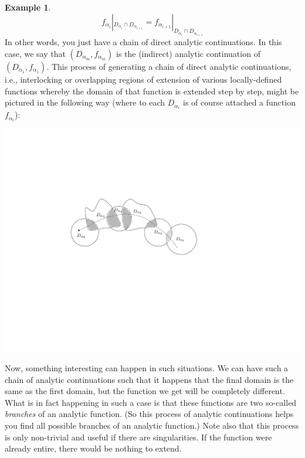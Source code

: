 \documentclass[11pt]{book}
\theoremstyle{definition}
\newtheorem{example}{Example}[section]
\theoremstyle{definition}
\theoremstyle{definition}
\theoremstyle{theorem}
\theoremstyle{definition}
\begin{document}
\begin{example}
	\begin{equation*}
	f_{\alpha_i}|_{D_{\alpha_i} \cap D_{\alpha_{i+1}}} = f_{\alpha_{i+1}}|_{D_{\alpha_i} \cap D_{\alpha_{i+1}}}
	\end{equation*}
	In other words, you just have a chain of direct analytic continuations. In this case, we say that $(D_{\alpha_m}, f_{\alpha_m})$ is the (indirect) analytic continuation of $(D_{\alpha_1}, f_{\alpha_1})$. This process of generating a chain of direct analytic continuations, i.e., interlocking or overlapping regions of extension of various locally-defined functions whereby the domain of that function is extended step by step, might be pictured in the following way (where to each $D_{\alpha_i}$ is of course attached a function $f_{\alpha_i}$): 
	\begin{center}
		\hspace*{-1cm}
		\includegraphics[scale=0.6]{AnalyticContination.png}
		\vspace*{-6cm}
	\end{center}
	Now, something interesting can happen in such situations. We can have such a chain of analytic continuations such that it happens that the final domain is the same as the first domain, but the function we get will be completely different. What is in fact happening in such a case is that these functions are two so-called \textit{branches} of an analytic function. (So this process of analytic continuations helps you find all possible branches of an analytic function.) Note also that this process is only non-trivial and useful if there are singularities. If the function were already entire, there would be nothing to extend. \par 

\end{example}
\end{document}
